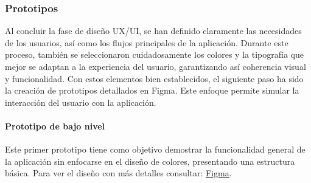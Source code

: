 
\subsubsection{Prototipos}

Al concluir la fase de diseño UX/UI, se han definido claramente las necesidades de los usuarios, así como los flujos principales de la aplicación. Durante este proceso, también se seleccionaron cuidadosamente los colores y la tipografía que mejor se adaptan a la experiencia del usuario, garantizando así coherencia visual y funcionalidad. Con estos elementos bien establecidos, el siguiente paso ha sido la creación de prototipos detallados en Figma. Este enfoque permite simular la interacción del usuario con la aplicación.

\paragraph{Prototipo de bajo nivel}
Este primer prototipo tiene como objetivo demostrar la funcionalidad general de la aplicación sin enfocarse en el diseño de colores, presentando una estructura básica. Para ver el diseño con más detalles consultar: \href{https://www.figma.com/design/d7NOw36r1mUY7qDBIveJ2K/Se%C3%B1as-Chapinas?node-id=45-820&node-type=SECTION&t=luJsnsyUNaEJGP24-0}{Figma}.

